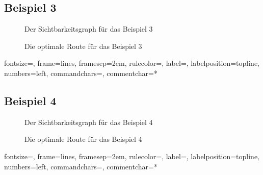 \documentclass[a4paper, notitlepage, 12pt]{scrartcl}
\begin{document}
\subsection{Beispiel 3}
\begin{minipage}[b]{0.45\linewidth}
	\begin{figure}[H]
		
		\caption{Der Sichtbarkeitsgraph für das Beispiel 3}
	\end{figure}
\end{minipage}
\hspace{0.5cm}
\begin{minipage}[b]{0.45\linewidth}
	\begin{figure}[H] 
		\caption{Die optimale Route für das Beispiel 3}
	\end{figure}
\end{minipage}
{fontsize=\footnotesize,
	frame=lines,  %
	framesep=2em, %
	rulecolor=\color{Gray},
	label=,
	labelposition=topline,
	numbers=left,
	commandchars=\|\(\), %
	commentchar=*        %
}
\subsection{Beispiel 4}
\begin{minipage}[b]{0.45\linewidth}
	\begin{figure}[H]
		
		\caption{Der Sichtbarkeitsgraph für das Beispiel 4}
	\end{figure}
\end{minipage}
\hspace{0.5cm}
\begin{minipage}[b]{0.45\linewidth}
	\begin{figure}[H] 
		\caption{Die optimale Route für das Beispiel 4}
	\end{figure}
\end{minipage}
{fontsize=\footnotesize,
	frame=lines,  %
	framesep=2em, %
	rulecolor=\color{Gray},
	label=,
	labelposition=topline,
	numbers=left,
	commandchars=\|\(\), %
	commentchar=*        %
}
\end{document}
